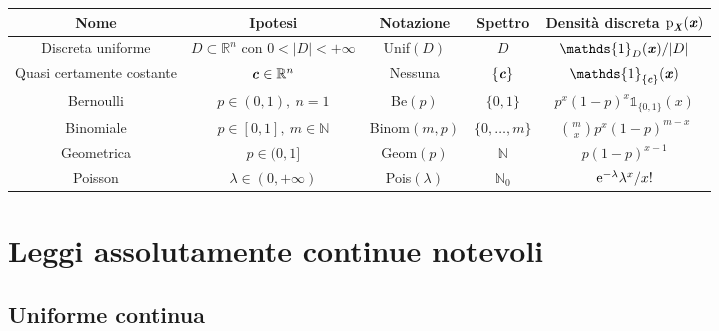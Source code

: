 \documentclass[11pt]{book}
\theoremstyle{Definizione}
\theoremstyle{TeoremaProposizioneLemmaCorollario}
\theoremstyle{OsservazioneNota}
\newcommand{\R}{\mathbb{R}}
\newcommand{\N}{\mathbb{N}}
\newcommand{\gri}[1]{\textbf{\textit{{#1}}}}
\newcommand{\p}{\textup{p}}
\newcommand{\e}{\textup{e}}
\newcommand{\uno}[1]{\mathds{1}_{#1}}
\begin{document}
\begin{center}
\begin{tabular}{|c|c|c|c|c|}
\hline
Nome              & Ipotesi & Notazione & Spettro & Densità discreta $\p_{\gri{X}}(\gri{x})$\\
\hline
Discreta uniforme & $D\subset \R^n$ con $0<|D|<+\infty$ & Unif$(D)$ & $D$ & $\uno{D}(\gri{x})/|D|$\\
\hline
Quasi certamente costante & $\gri{c}\in \R^n$ & Nessuna & $\{\gri{c}\}$ & $\uno{\{\gri{c}\}}(\gri{x})$\\ 
\hline
Bernoulli & $p\in (0,1),\ n = 1$ & Be$(p)$ & $\{0,1\}$ & $ p^x(1-p)^x\uno{\{0,1\}}(x)$\\
\hline
Binomiale & $p\in [0,1],\ m \in \N$ & Binom$(m,p)$ & $\{0,\dots,m\}$ & $\binom{m}{x}p^{x}(1-p)^{m-x}$ \\
\hline
Geometrica & $p\in (0,1]$ & Geom$(p)$ & $\N$ & $p(1-p)^{x-1}$\\
\hline
Poisson & $\lambda \in (0,+\infty)$ & Pois$(\lambda)$ & $\N_0$ & $\e^{-\lambda}\lambda^x/x!$\\
\hline
\end{tabular}
\end{center}
\section{Leggi assolutamente continue notevoli}
\subsection{Uniforme continua}
\end{document}
